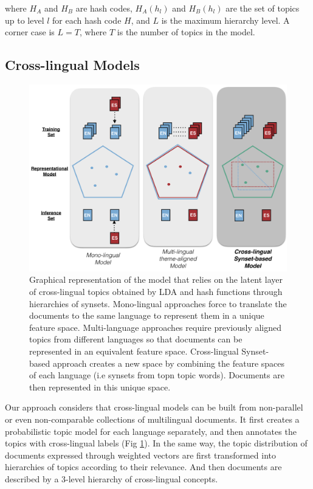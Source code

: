 where $H_A$ and $H_B$ are hash codes, $H_A(h_l)$ and $H_B(h_l)$ are the set of topics up to level $l$ for each hash code $H$,  and $L$ is the maximum hierarchy level. A corner case is $L=T$, where $T$ is the number of topics in the model. 

\subsection{Cross-lingual Models}
\label{sec:crosslingual-models}

\begin{figure}[ht]\centering
\includegraphics[scale=0.4]{latent-topic-models.png}
\caption{Graphical representation of the model that relies on the latent layer of cross-lingual topics obtained by LDA and hash functions through hierarchies of synsets. Mono-lingual approaches force to translate the documents to the same language to represent them in a unique feature space. Multi-language approaches require previously aligned topics from different languages so that documents can be represented in an equivalent feature space. Cross-lingual Synset-based approach creates a new space by combining the feature spaces of each language (i.e synsets from topn topic words). Documents are then represented in this unique space.}
\label{fig:cross-lingual_topics}
\end{figure}

Our approach considers that cross-lingual models can be built from non-parallel or even non-comparable collections of multilingual documents. It first creates a probabilistic topic model for each language separately, and then annotates the topics with cross-lingual labels (Fig \ref{fig:cross-lingual_topics}). In the same way, the topic distribution of documents expressed through weighted vectors are first transformed into hierarchies of topics according to their relevance. And then documents are described by a 3-level hierarchy of cross-lingual concepts.

